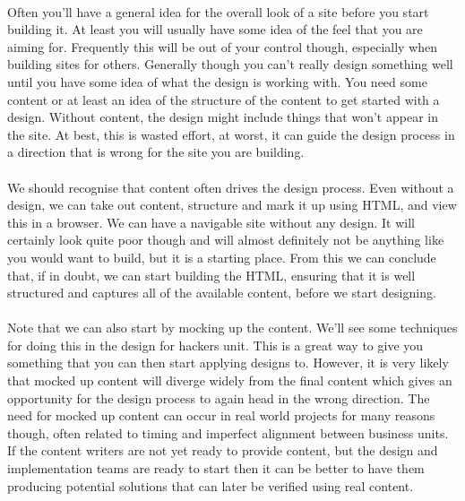 \paragraph{} Often you'll have a general idea for the overall look of a site before you start building it. At least you will usually have some idea of the feel that you are aiming for. Frequently this will be out of your control though, especially when building sites for others. Generally though you can’t really design something well until you have some idea of what the design is working with. You need some content or at least an idea of the structure of the content to get started with a design. Without content, the design might include things that won't appear in the site. At best, this is wasted effort, at worst, it can guide the design process in a direction that is wrong for the site you are building.
\paragraph{} We should recognise that content often drives the design process. Even without a design, we can take out content, structure and mark it up using HTML, and view this in a browser. We can have a navigable site without any design. It will certainly look quite poor though and will almost definitely not be anything like you would want to build, but it is a starting place. From this we can conclude that, if in doubt, we can start building the HTML, ensuring that it is well structured and captures all of the available content, before we start designing.
\paragraph{} Note that we can also start by mocking up the content. We'll see some techniques for doing this in the design for hackers unit. This is a great way to give you something that you can then start applying designs to. However, it is very likely that mocked up content will diverge widely from the final content which gives an opportunity for the design process to again head in the wrong direction. The need for mocked up content can occur in real world projects for many reasons though, often related to timing and imperfect alignment between business units. If the content writers are not yet ready to provide content, but the design and implementation teams are ready to start then it can be better to have them producing potential solutions that can later be verified using real content.
